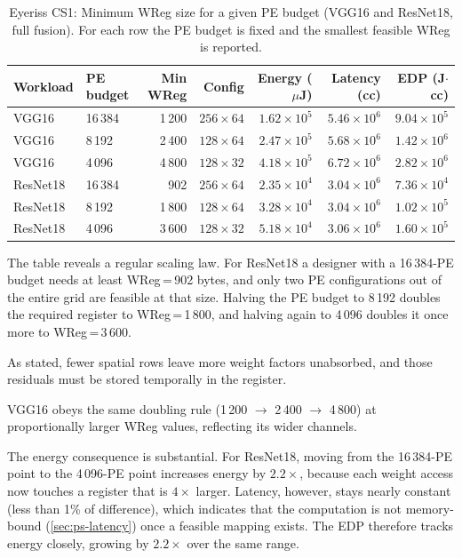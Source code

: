 \begin{table}[htbp]
  \centering
  \caption{Eyeriss CS1: Minimum WReg size for a given PE budget
    (VGG16 and ResNet18, full fusion).
    For each row the PE budget is fixed and the smallest feasible WReg
    is reported.}
  \label{tab:eyeriss-cs1-wreg}
  \begin{tabular}{llrrrrr}
    \toprule
    Workload & PE budget & Min WReg & Config & Energy ($\mu$J) &
      Latency (cc) & EDP (J$\cdot$cc) \\
    \midrule
    VGG16    & 16\,384 & 1\,200  & $256 \times 64$  & $1.62 \times 10^{5}$
             & $5.46 \times 10^{6}$ & $9.04 \times 10^{5}$ \\
    VGG16    & 8\,192  & 2\,400  & $128 \times 64$  & $2.47 \times 10^{5}$
             & $5.68 \times 10^{6}$ & $1.42 \times 10^{6}$ \\
    VGG16    & 4\,096  & 4\,800  & $128 \times 32$  & $4.18 \times 10^{5}$
             & $6.72 \times 10^{6}$ & $2.82 \times 10^{6}$ \\
    \midrule
    ResNet18 & 16\,384 & 902     & $256 \times 64$  & $2.35 \times 10^{4}$
             & $3.04 \times 10^{6}$ & $7.36 \times 10^{4}$ \\
    ResNet18 & 8\,192  & 1\,800  & $128 \times 64$  & $3.28 \times 10^{4}$
             & $3.04 \times 10^{6}$ & $1.02 \times 10^{5}$ \\
    ResNet18 & 4\,096  & 3\,600  & $128 \times 32$  & $5.18 \times 10^{4}$
             & $3.06 \times 10^{6}$ & $1.60 \times 10^{5}$ \\
    \bottomrule
  \end{tabular}
\end{table}

The table reveals a regular scaling law.
For ResNet18 a designer with a 16\,384-PE budget needs at least
WReg\,=\,902 bytes, and only two PE configurations out of the entire
grid are feasible at that size.
Halving the PE budget to 8\,192 doubles the required register to
WReg\,=\,1\,800, and halving again to 4\,096 doubles it once more to
WReg\,=\,3\,600.

As stated, fewer spatial rows leave more weight
factors unabsorbed, and those residuals must be stored temporally in
the register.

VGG16 obeys the same doubling rule (1\,200 $\to$ 2\,400 $\to$ 4\,800)
at proportionally larger WReg values, reflecting its wider channels.

The energy consequence is substantial.
For ResNet18, moving from the 16\,384-PE point
 to the 4\,096-PE point
 increases energy by $2.2\times$,
because each weight access now touches a register that is $4\times$
larger.
Latency, however, stays nearly constant
(less than 1\% of difference), which indicates that the
computation is not memory-bound (\ref{sec:ps-latency}) once a feasible mapping exists.
The EDP therefore tracks energy closely, growing by $2.2\times$ over
the same range.

